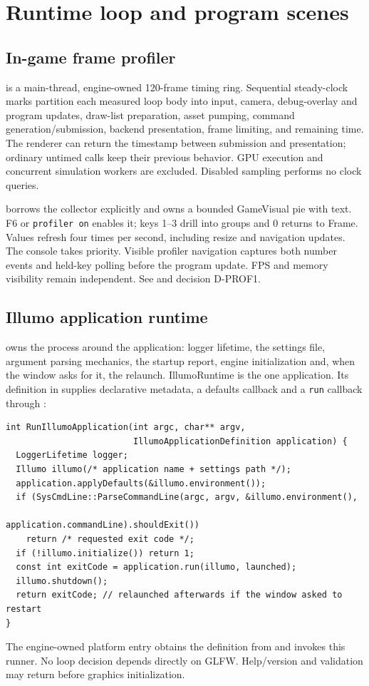 \section{Runtime loop and program scenes}
\label{sec:runtime}

\subsection{In-game frame profiler}
 is a main-thread, engine-owned 120-frame timing ring.
Sequential steady-clock marks partition each measured loop body into input,
camera, debug-overlay and program updates, draw-list preparation, asset
pumping, command generation/submission, backend presentation, frame limiting,
and remaining time.
The renderer can return the timestamp between submission and presentation;
ordinary untimed calls keep their previous behavior. GPU execution and concurrent
simulation workers are excluded. Disabled sampling performs no clock queries.

 borrows the collector explicitly and owns a bounded
GameVisual pie with text. F6 or \texttt{profiler on} enables it; keys 1--3
drill into groups and 0 returns to Frame. Values refresh four times per second,
including resize and navigation updates. The console takes priority. Visible
profiler navigation captures both number events and held-key polling before
the program update. FPS and memory visibility remain independent. See
 and decision D-PROF1.

\subsection{Illumo application runtime}
 owns the process around the
application: logger lifetime, the settings file, argument parsing mechanics,
the startup report, engine initialization and, when the window asks for it,
the relaunch. IllumoRuntime is the one application. Its definition in
 supplies declarative
metadata, a defaults callback and a \texttt{run} callback through
:
\begin{lstlisting}
int RunIllumoApplication(int argc, char** argv,
                         IllumoApplicationDefinition application) {
  LoggerLifetime logger;
  Illumo illumo(/* application name + settings path */);
  application.applyDefaults(&illumo.environment());
  if (SysCmdLine::ParseCommandLine(argc, argv, &illumo.environment(),
                                   application.commandLine).shouldExit())
    return /* requested exit code */;
  if (!illumo.initialize()) return 1;
  const int exitCode = application.run(illumo, launched);
  illumo.shutdown();
  return exitCode; // relaunched afterwards if the window asked to restart
}
\end{lstlisting}
The engine-owned platform entry obtains the definition from
 and invokes this runner. No loop decision
depends directly on GLFW. Help/version and validation may return before
graphics initialization.

